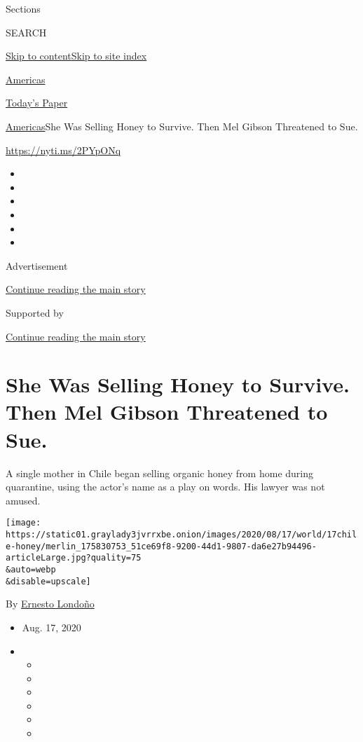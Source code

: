 Sections

SEARCH

\protect\hyperlink{site-content}{Skip to
content}\protect\hyperlink{site-index}{Skip to site index}

\href{https://www.nytimes3xbfgragh.onion/section/world/americas}{Americas}

\href{https://myaccount.nytimes3xbfgragh.onion/auth/login?response_type=cookie\&client_id=vi}{}

\href{https://www.nytimes3xbfgragh.onion/section/todayspaper}{Today's
Paper}

\href{/section/world/americas}{Americas}\textbar{}She Was Selling Honey
to Survive. Then Mel Gibson Threatened to Sue.

\url{https://nyti.ms/2PYpONq}

\begin{itemize}
\item
\item
\item
\item
\item
\item
\end{itemize}

Advertisement

\protect\hyperlink{after-top}{Continue reading the main story}

Supported by

\protect\hyperlink{after-sponsor}{Continue reading the main story}

\hypertarget{she-was-selling-honey-to-survive-then-mel-gibson-threatened-to-sue}{%
\section{She Was Selling Honey to Survive. Then Mel Gibson Threatened to
Sue.}\label{she-was-selling-honey-to-survive-then-mel-gibson-threatened-to-sue}}

A single mother in Chile began selling organic honey from home during
quarantine, using the actor's name as a play on words. His lawyer was
not amused.

\texttt{[image: https://static01.graylady3jvrrxbe.onion/images/2020/08/17/world/17chile-honey/merlin\_175830753\_51ce69f8-9200-44d1-9807-da6e27b94496-articleLarge.jpg?quality=75\\\&auto=webp\\\&disable=upscale]}

By \href{https://www.nytimes3xbfgragh.onion/by/ernesto-londono}{Ernesto
Londoño}

\begin{itemize}
\item
  Aug. 17, 2020
\item
  \begin{itemize}
  \item
  \item
  \item
  \item
  \item
  \item
  \end{itemize}
\end{itemize}

